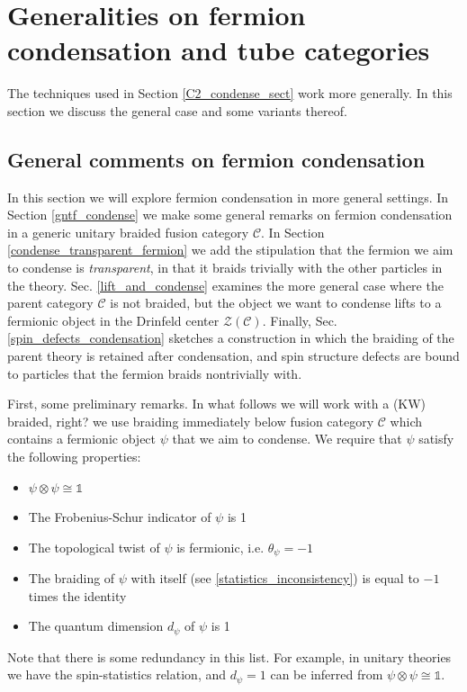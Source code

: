 \documentclass[12pt,a4paper]{article}
\newcommand{\tp}{\otimes}
\newcommand{\unit}{\mathds{1}}
\newcommand{\mcz}{\mathcal{Z}}
\newcommand{\mcc}{\mathcal{C}}
\newcommand{\ot}{\otimes}
\newcommand{\kw}[1]{{\color{kwcolor}\footnotesize{(KW) #1}}}
\begin{document}
\section{Generalities on fermion condensation and tube categories} \label{generalities} 

The techniques used in Section \ref{C2_condense_sect} work more generally.
In this section we discuss the general case and some variants thereof.

\subsection{General comments on fermion condensation}

In this section we will explore fermion condensation in more general settings. 
In Section \ref{gntf_condense} we make some general remarks on fermion condensation in a
generic unitary braided fusion category $\mcc$. 
In Section \ref{condense_transparent_fermion} we add the stipulation that the fermion we aim 
to condense is {\it transparent}, in that it braids trivially with the other particles in the theory. 
Sec. \ref{lift_and_condense} examines the more general case where the parent category $\mcc$ is not braided,
but the object we want to condense lifts to a fermionic object in the Drinfeld center $\mcz(\mcc)$.
Finally, Sec. \ref{spin_defects_condensation} sketches a construction in which the braiding 
of the parent theory is retained after condensation, and spin structure defects are bound to 
particles that the fermion braids nontrivially with. 

First, some preliminary remarks. 
In what follows we will work with a 
\kw{braided, right?  we use braiding immediately below} 
fusion category $\mathcal{C}$ which contains a fermionic object $\psi$ that we aim to condense. 
We require that $\psi$ satisfy the following properties:
\begin{itemize} 
	\item $\psi\ot\psi\cong\unit$
	\item The Frobenius-Schur indicator of $\psi$ is 1
	\item The topological twist of $\psi$ is fermionic, i.e. $\theta_\psi =-1$
	\item The braiding of $\psi$ with itself (see \eqref{statistics_inconsistency}) is equal to $-1$ times the identity
	\item The quantum dimension $d_\psi$ of $\psi$ is 1
\end{itemize}
Note that there is some redundancy in this list.
For example, 
in unitary theories we have the spin-statistics relation, and $d_\psi=1$ can be inferred from $\psi\tp\psi \cong \unit$.
\end{document}
